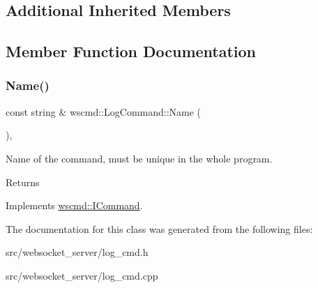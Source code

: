 \subsection*{Additional Inherited Members}


\subsection{Member Function Documentation}
\mbox{\label{classwscmd_1_1LogCommand_a465f14b51110d3f0a7d5fe873bafd857}} 
\subsubsection{\texorpdfstring{Name()}{Name()}}
{\footnotesize\ttfamily const string \& wscmd\+::\+Log\+Command\+::\+Name (\begin{DoxyParamCaption}{ }\end{DoxyParamCaption})\hspace{0.3cm}{\ttfamily [override]}, {\ttfamily [virtual]}}



Name of the command, must be unique in the whole program. 

\begin{DoxyReturn}{Returns}

\end{DoxyReturn}


Implements \hyperlink{classwscmd_1_1ICommand_a1a9fdc32265fa902cb5f3ab153386a9e}{wscmd\+::\+I\+Command}.



The documentation for this class was generated from the following files\+:\begin{DoxyCompactItemize}
\item 
src/websocket\+\_\+server/log\+\_\+cmd.\+h\item 
src/websocket\+\_\+server/log\+\_\+cmd.\+cpp\end{DoxyCompactItemize}
